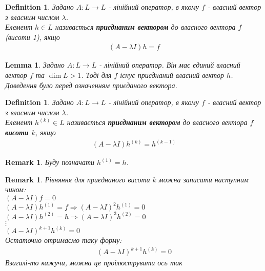\documentclass[a4paper, 10pt]{article}
\theoremstyle{theoremdd}
\theoremstyle{theoremdd}
\newtheorem{definition}[theorem]{Definition}
\theoremstyle{theoremdd}
\theoremstyle{theoremdd}
\theoremstyle{theoremdd}
\theoremstyle{theoremdd}
\newtheorem{remark}[theorem]{Remark}
\theoremstyle{theoremdd}
\newtheorem{lemma}[theorem]{Lemma}
\theoremstyle{theoremdd}
\begin{document}
\begin{definition}
Задано $A: L \to L$ - лінійний оператор, в якому $f$ - власний вектор з власним числом $\lambda$.\\
Елемент $h \in L$ називається \textbf{приєднаним вектором} до власного вектора $f$ (висоти 1), якщо
\begin{align*}
(A-\lambda I)h = f
\end{align*}
\end{definition}

\begin{lemma}
Задано $A: L \to L$ - лінійний оператор. Він має єдиний власний вектор $f$ та $\dim L > 1$. Тоді для $f$ існує приєднаний власний вектор $h$.\\
\textit{Доведення було перед означенням приєданого вектора.}
\end{lemma}

\begin{definition}
Задано $A: L \to L$ - лінійний оператор, в якому $f$ - власний вектор з власним числом $\lambda$.\\
Елемент $h^{(k)} \in L$ називається \textbf{приєднаним вектором} до власного вектора $f$ \textbf{висоти $k$}, якщо
\begin{align*}
(A-\lambda I)h^{(k)} = h^{(k-1)}
\end{align*}
\end{definition}

\begin{remark}
Буду позначати $h^{(1)} = h$.
\end{remark}

\begin{remark}
Рівняння для приєднаного висоти $k$ можна записати наступним чином:\\
$(A-\lambda I)f = 0$\\
$(A-\lambda I)h^{(1)} = f \Rightarrow (A-\lambda I)^2 h^{(1)} = 0$\\
$(A-\lambda I)h^{(2)} = h \Rightarrow (A-\lambda I)^3 h^{(2)} = 0$\\
$\vdots$\\
$(A-\lambda I)^{k+1}h^{(k)} = 0$\\
Остаточно отримаємо таку форму:
\begin{align*}
(A-\lambda I)^{k+1}h^{(k)} = 0
\end{align*}
Взагалі-то кажучи, можна це проілюструвати ось так
\begin{figure}[H]
\centering
{}
\end{figure}
\end{remark}
\end{document}

